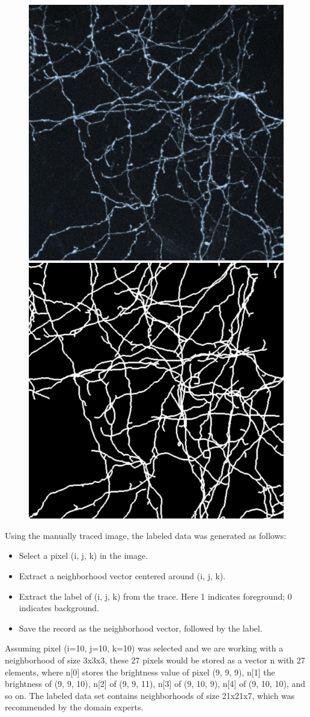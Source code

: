 \documentclass{neu_handout}
\begin{document}
\begin{figure}[h]
\centering
{
\includegraphics[width=0.2\linewidth]{image1}
\label{fig:left}
}
{
\includegraphics[width=0.2\linewidth]{image2}
\label{fig:right}
}
\end{figure}


Using the manually traced image, the labeled data was generated as follows:
\newenvironment{myitemize}
{ \begin{itemize}
    \setlength{\itemsep}{0pt}
    \setlength{\parskip}{0pt}
    \setlength{\parsep}{0pt}     }
{ \end{itemize}                  } 

\begin{myitemize}
  \item Select a pixel (i, j, k) in the image.
  \item Extract a neighborhood vector centered around (i, j, k).
  \item Extract the label of (i, j, k) from the trace. Here 1 indicates foreground; 0 indicates background.
  \item  Save the record as the neighborhood vector, followed by the label.
\end{myitemize}

Assuming pixel (i=10, j=10, k=10) was selected and we are working with a neighborhood of size 3x3x3, these 27 pixels would be stored as a vector n with 27 elements, where n[0] stores the brightness value of
pixel (9, 9, 9), n[1] the brightness of (9, 9, 10), n[2] of (9, 9, 11), n[3] of (9, 10, 9), n[4] of (9, 10, 10), and so on. The labeled data set contains neighborhoods of size 21x21x7, which was recommended by the domain experts.\\
\end{document}

